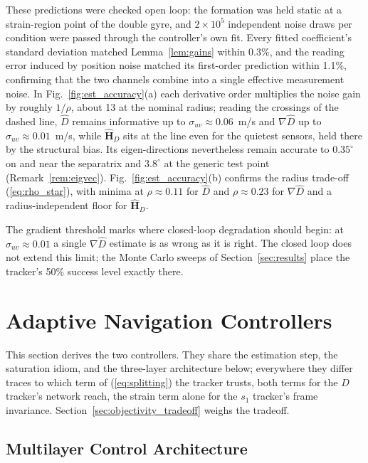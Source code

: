 \documentclass[lettersize,journal]{IEEEtran}
\begin{document}
These predictions were checked open loop: the formation was held static
at a strain-region point of the double gyre, and $2 \times 10^5$
independent noise draws per condition were passed through the
controller's own fit. Every fitted coefficient's standard deviation
matched Lemma~\ref{lem:gains} within 0.3\%, and the reading error
induced by position noise matched its first-order prediction within
1.1\%, confirming that the two channels combine into a single effective
measurement noise. In Fig.~\ref{fig:est_accuracy}(a) each derivative
order multiplies the noise gain by roughly $1/\rho$, about 13 at the
nominal radius; reading the crossings of the dashed line, $\hat{D}$
remains informative up to $\sigma_{uv} \approx 0.06$~m/s and
$\nabla\hat{D}$ up to $\sigma_{uv} \approx 0.01$~m/s, while
$\hat{\mathbf{H}}_D$ sits at the line even for the quietest sensors,
held there by the structural bias. Its eigen-directions nevertheless
remain accurate to $0.35^\circ$ on and near the separatrix and
$3.8^\circ$ at the generic test point (Remark~\ref{rem:eigvec}).
Fig.~\ref{fig:est_accuracy}(b) confirms the radius trade-off
(\ref{eq:rho_star}), with minima at $\rho \approx 0.11$ for $\hat{D}$
and $\rho \approx 0.23$ for $\nabla\hat{D}$ and a radius-independent
floor for $\hat{\mathbf{H}}_D$.

The gradient threshold marks where closed-loop degradation should
begin: at $\sigma_{uv} \approx 0.01$ a single $\nabla\hat{D}$ estimate
is as wrong as it is right. The closed loop does not extend this limit;
the Monte Carlo sweeps of Section~\ref{sec:results} place the tracker's
50\% success level exactly there.

\section{Adaptive Navigation Controllers}
\label{sec:controllers}

This section derives the two controllers. They share the estimation
step, the saturation idiom, and the three-layer architecture below;
everywhere they differ traces to which term of (\ref{eq:splitting}) the
tracker trusts, both terms for the $D$ tracker's network reach, the
strain term alone for the $s_1$ tracker's frame invariance.
Section~\ref{sec:objectivity_tradeoff} weighs the tradeoff.

\subsection{Multilayer Control Architecture}
\label{sec:arch}
\end{document}
